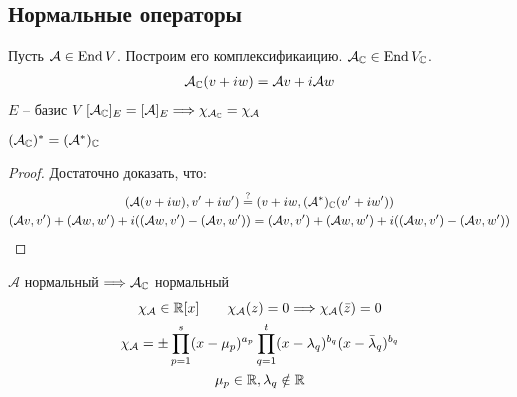 \subsection*{Нормальные операторы}
Пусть $\mathcal{A} \in \operatorname{End}{V}$. Построим его комплексификаицию. 
$\mathcal{A}_{\mathbb{C}} \in \operatorname{End}{V_{\mathbb{C}}}$. 
\begin{gather*}
    \mathcal{A}_{\mathbb{C}}(v + iw) = \mathcal{A}v + i \mathcal{A} w
\end{gather*}
$E$ -- базис $V$ \qquad $[\mathcal{A}_{\mathbb{C}}]_E = [\mathcal{A}]_E \Longrightarrow \chi_{\mathcal{A}_{\mathbb{C}}} = \chi_{\mathcal{A}}$ 

\begin{lemma}
    $(\mathcal{A}_{\mathbb{C}})^* = (\mathcal{A}^*)_{\mathbb{C}}$
\end{lemma}
\begin{proof}
    Достаточно доказать, что: 
    \begin{gather*}
        (\mathcal{A}(v + iw), v' + i w') \overset{?}{=} (v + iw, (\mathcal{A}^*)_{\mathbb{C}} (v' + iw')) \\
        (\mathcal{A} v, v') + (\mathcal{A} w, w') + i ((\mathcal{A}w, v') - (\mathcal{A} v, w')) = 
        (\mathcal{A} v, v') + (\mathcal{A} w, w') + i ((\mathcal{A}w, v') - (\mathcal{A} v, w'))
    \end{gather*}
\end{proof}
\follow $\mathcal{A}$ нормальный $\Longrightarrow \mathcal{A}_{\mathbb{C}}$ нормальный
\begin{gather*}
    \chi_{\mathcal{A}} \in \mathbb{R}[x] \qquad \chi_{\mathcal{A}} (z) = 0 \Longrightarrow \chi_\mathcal{A} (\bar z) = 0 \\
    \chi_\mathcal{A} = \pm \prod\limits_{p=1}^s (x - \mu_p)^{a_p} \prod\limits_{q = 1}^t (x - \lambda_q)^{b_q} (x - \bar \lambda_q)^{b_q} \\
    \mu_p \in \mathbb{R}, \lambda_q \notin \mathbb{R}
\end{gather*}

